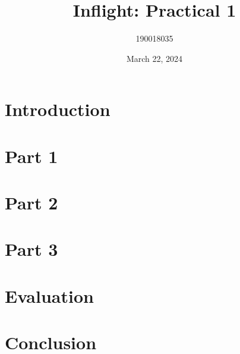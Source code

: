 \documentclass{article}
\title{Inflight: Practical 1}
\author{190018035}
\date{March 22, 2024}
\begin{document}
\maketitle

\tableofcontents

\section{Introduction}

\section{Part 1}

\section{Part 2}

\section{Part 3}

\section{Evaluation}

\section{Conclusion}
\end{document}
